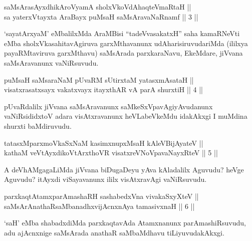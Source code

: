 
\begin{shl}
saMsArasAyxdhikAroV\s yamA sholxVkoVdAhaqteVmaRtaH || \\
sa yaterxVtayxta AraBayx puMsaH saMsAravaNaRnamf \hfill || 3 ||
  
\end{shl}

\begin{artha}
`sayatArxyaM' eMbalilxMda AraMBisi ``tadeVvasakatxH'' saha kamaRNeVti
eMba sholxVkasahitavAgiruva garxMthavanunx udAharisiruvudariMda
(ililxya payaRMtaviruva garxMthavu) saMsArada parxkaraNavu,
EkeMdare, jiVvana saMsAravanunx vaNiRsuvudu.
\end{artha}


\begin{shl}
puMsaH saMsaraNaM pUvaRM sUtirxtaM yatasxmAsataH || \\
visatxrasatxsayx vakatxvayx itayxthAR vA parA shurxtiH \hfill || 4 ||
  
\end{shl}

\begin{artha}
pUvaRdalilx jiVvana saMsAravanunx saMkeSxVpavAgiyAvudanunx
vaNiRsididxtoV adara visAtxravanunx heVLabeVkeMdu idakAkxgi I muMdina
shurxti baMdiruvudu.
\end{artha}

\begin{shl}
tatasxMparxmoVkaSxNaM kasimxnupxMsaH kAleV\s BijAyateV || \\
kathaM veVtAyxdikoV\s tArxthoVR visatxreVNoVpavaNayxRteV \hfill || 5 ||
  
\end{shl}

\begin{artha}
A deVhAMgagaLiMda jiVvana biDugaDeyu yAva kAladalilx Aguvudu? heVge
Aguvudu? itAyxdi viSayavanunx ililx visAtxravAgi vaNiRsuvudu.
\end{artha}

\begin{shl}
parxkaqtAtamxparAmashaRH sashabedxVna vivakaSxyXteV || \\
saMsArAnathaRsaMbanadhxvijAcnxnAya tamasivxnaH \hfill || 6 ||
  
\end{shl}

\begin{artha}
`saH' eMba shabadxdiMda parxkaqtavAda Atamxnanunx parAmashiRsuvudu,
adu ajAcnxnige saMsArada anathaR saMbaMdhavu tiLiyuvudakAkxgi.
\end{artha}

